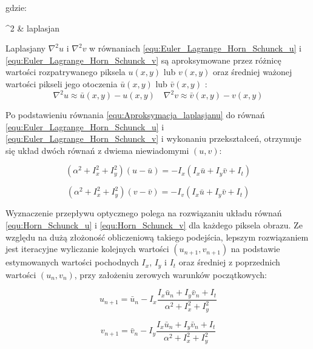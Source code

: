 \noindent
gdzie:

\begin{conditions}
	 \nabla^2 & laplasjan \\
\end{conditions}

Laplasjany $\nabla^2 u$ i $\nabla^2 v$ w równaniach \ref{equ:Euler_Lagrange_Horn_Schunck_u} i \ref{equ:Euler_Lagrange_Horn_Schunck_v} są aproksymowane przez różnicę wartości rozpatrywanego piksela $u(x,y)$ lub $v(x,y)$ oraz średniej ważonej wartości pikseli jego otoczenia $\bar{u}(x,y)$ lub $\bar{v}(x,y)$ \cite{Horn1981}:
\begin{equation}
\label{equ:Aproksymacja_laplasjanu}
	\nabla^2 u  \approx \bar{u}(x,y) - u(x,y)
	\, \, \, \, \, \,
	\nabla^2 v  \approx \bar{v}(x,y) - v(x,y)
\end{equation}

Po podstawieniu równania \ref{equ:Aproksymacja_laplasjanu} do równań \ref{equ:Euler_Lagrange_Horn_Schunck_u} i \ref{equ:Euler_Lagrange_Horn_Schunck_v} i wykonaniu przekształceń, otrzymuje się układ dwóch równań z dwiema niewiadomymi $(u,v)$:

\begin{equation}
\label{equ:Horn_Schunck_u}
	(\alpha^2 + I_x^2 + I_y^2)(u - \bar{u}) = -I_x(I_x \bar{u} + I_y \bar{v} + I_t)
\end{equation}

\begin{equation}
\label{equ:Horn_Schunck_v}
	(\alpha^2 + I_x^2 + I_y^2)(v - \bar{v}) = -I_v(I_x \bar{u} + I_y \bar{v} + I_t)
\end{equation}

Wyznaczenie przepływu optycznego polega na rozwiązaniu układu równań \ref{equ:Horn_Schunck_u} i \ref{equ:Horn_Schunck_v} dla każdego piksela obrazu. Ze względu na dużą złożoność obliczeniową takiego podejścia, lepszym rozwiązaniem jest iteracyjne wyliczanie kolejnych wartości $(u_{n+1}, v_{n+1})$ na podstawie estymowanych wartości pochodnych $I_x$, $I_y$ i $I_t$ oraz średniej z poprzednich wartości $(u_n, v_n)$, przy założeniu zerowych warunków początkowych:

\begin{equation}
\label{equ:Horn_Schunck_iteracyjnie_u}
	u_{n+1} = \bar{u}_n - I_x \frac{I_x \bar{u}_n + I_y \bar{v}_n + I_t}{\alpha^2 + I_x^2 + I_y^2}
\end{equation}

\begin{equation}
\label{equ:Horn_Schunck_iteracyjnie_v}
	v_{n+1} = \bar{v}_n - I_y \frac{I_x \bar{u}_n + I_y \bar{v}_n + I_t}{\alpha^2 + I_x^2 + I_y^2}
\end{equation}

